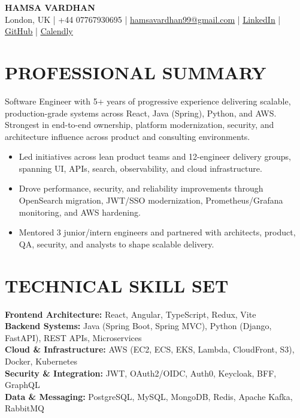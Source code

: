 \documentclass[10pt]{article}
\begin{document}
\begin{center}
{\Large \textbf{HAMSA VARDHAN}}\\[2pt]
London, UK \;|\; +44 07767930695 \;|\;
\href{mailto:hamsavardhan99@gmail.com}{hamsavardhan99@gmail.com} \;|\;
\href{https://linkedin.com/in/hamsa-vardhan}{\underline{LinkedIn}} \;|\;
\href{https://github.com/hamsa-vd}{\underline{GitHub}} \;|\;
\href{https://calendly.com/hamsa-vd/intro-call}{\underline{Calendly}}
\end{center}

\vspace{-2pt}

\section*{PROFESSIONAL SUMMARY}

Software Engineer with 5+ years of progressive experience delivering scalable, production-grade systems across React, Java (Spring), Python, and AWS. Strongest in end-to-end ownership, platform modernization, security, and architecture influence across product and consulting environments.
\begin{itemize}
  \item Led initiatives across lean product teams and 12-engineer delivery groups, spanning UI, APIs, search, observability, and cloud infrastructure.
  \item Drove performance, security, and reliability improvements through OpenSearch migration, JWT/SSO modernization, Prometheus/Grafana monitoring, and AWS hardening.
  \item Mentored 3 junior/intern engineers and partnered with architects, product, QA, security, and analysts to shape scalable delivery.
\end{itemize}

\section*{TECHNICAL SKILL SET}

\textbf{Frontend Architecture:} React, Angular, TypeScript, Redux, Vite\\
\textbf{Backend Systems:} Java (Spring Boot, Spring MVC), Python (Django, FastAPI), REST APIs, Microservices\\
\textbf{Cloud \& Infrastructure:} AWS (EC2, ECS, EKS, Lambda, CloudFront, S3), Docker, Kubernetes\\
\textbf{Security \& Integration:} JWT, OAuth2/OIDC, Auth0, Keycloak, BFF, GraphQL\\
\textbf{Data \& Messaging:} PostgreSQL, MySQL, MongoDB, Redis, Apache Kafka, RabbitMQ
\end{document}
